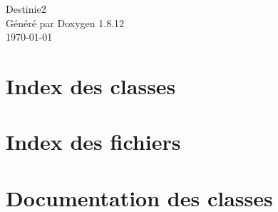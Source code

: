 \documentclass[twoside]{article}
\newcommand{\+}{\discretionary{\mbox{\scriptsize$\hookleftarrow$}}{}{}}
\begin{document}
\hypersetup{pageanchor=false,
             bookmarksnumbered=true,
             pdfencoding=unicode
            }
\begin{titlepage}
\vspace*{7cm}
\begin{center}%
{\Large Destinie2 }\\
\vspace*{1cm}
{\large Généré par Doxygen 1.8.12}\\
\vspace*{0.5cm}
{\small \today }\\
\end{center}
\end{titlepage}
\tableofcontents
{}
\hypersetup{pageanchor=true}



\section{Index des classes}

\section{Index des fichiers}

\section{Documentation des classes}












































\end{document}

